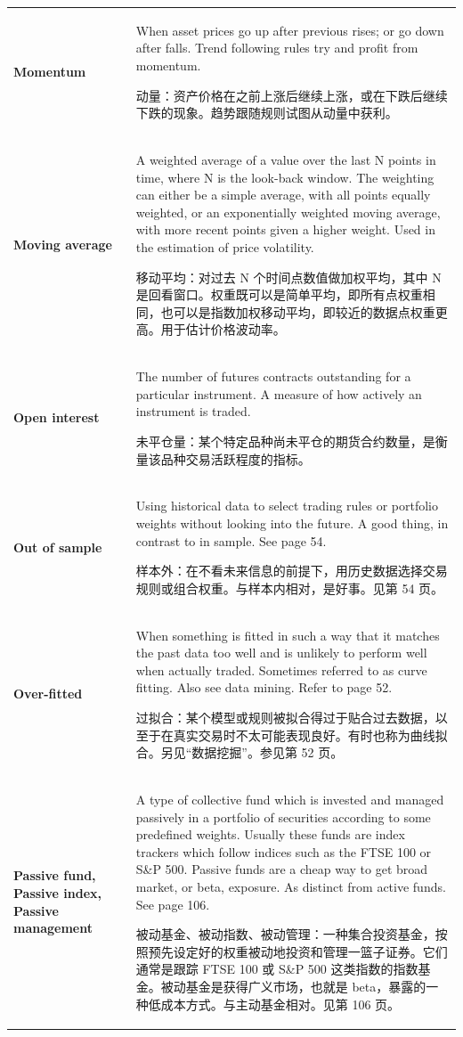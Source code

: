 \begin{chinesetableblock}
{\begin{longtable}{@{}>{\raggedright\arraybackslash\bfseries} p{}>{\raggedright\arraybackslash} p{}@{}}
Momentum & When asset prices go up after previous rises; or go down after falls. Trend following rules try and profit from momentum. \par 动量：资产价格在之前上涨后继续上涨，或在下跌后继续下跌的现象。趋势跟随规则试图从动量中获利。 \\[0.65em]
Moving average & A weighted average of a value over the last N points in time, where N is the look-back window. The weighting can either be a simple average, with all points equally weighted, or an exponentially weighted moving average, with more recent points given a higher weight. Used in the estimation of price volatility. \par 移动平均：对过去 N 个时间点数值做加权平均，其中 N 是回看窗口。权重既可以是简单平均，即所有点权重相同，也可以是指数加权移动平均，即较近的数据点权重更高。用于估计价格波动率。 \\[0.65em]
Open interest & The number of futures contracts outstanding for a particular instrument. A measure of how actively an instrument is traded. \par 未平仓量：某个特定品种尚未平仓的期货合约数量，是衡量该品种交易活跃程度的指标。 \\[0.65em]
Out of sample & Using historical data to select trading rules or portfolio weights without looking into the future. A good thing, in contrast to in sample. See page 54. \par 样本外：在不看未来信息的前提下，用历史数据选择交易规则或组合权重。与样本内相对，是好事。见第 54 页。 \\[0.65em]
Over-fitted & When something is fitted in such a way that it matches the past data too well and is unlikely to perform well when actually traded. Sometimes referred to as curve fitting. Also see data mining. Refer to page 52. \par 过拟合：某个模型或规则被拟合得过于贴合过去数据，以至于在真实交易时不太可能表现良好。有时也称为曲线拟合。另见“数据挖掘”。参见第 52 页。 \\[0.65em]
Passive fund, Passive index, Passive management & A type of collective fund which is invested and managed passively in a portfolio of securities according to some predefined weights. Usually these funds are index trackers which follow indices such as the FTSE 100 or S\&P 500. Passive funds are a cheap way to get broad market, or beta, exposure. As distinct from active funds. See page 106. \par 被动基金、被动指数、被动管理：一种集合投资基金，按照预先设定好的权重被动地投资和管理一篮子证券。它们通常是跟踪 FTSE 100 或 S\&P 500 这类指数的指数基金。被动基金是获得广义市场，也就是 beta，暴露的一种低成本方式。与主动基金相对。见第 106 页。 \\[0.65em]

\end{longtable}}
\end{chinesetableblock}

